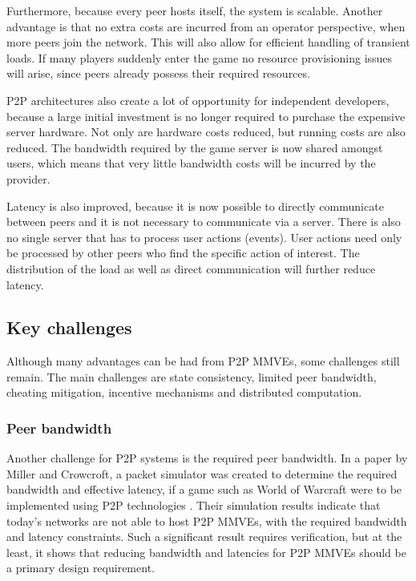 Furthermore, because every peer hosts itself, the system is scalable. Another advantage is that no extra costs are incurred from an operator
perspective, when more peers join the network. This will also allow for efficient handling of transient loads. If many players suddenly enter the
game no resource provisioning issues will arise, since peers already possess their required resources.

P2P architectures also create a lot of opportunity for independent developers, because a large initial investment is no longer required to purchase
the expensive server hardware. Not only are hardware costs reduced, but running costs are also reduced. The bandwidth required by the game server is
now shared amongst users, which means that very little bandwidth costs will be incurred by the provider.

Latency is also improved, because it is now possible to directly communicate between peers and it is not necessary to communicate via a server. There
is also no single server that has to process user actions (events). User actions need only be processed by other peers who find the specific action of interest. The distribution of the load as well as direct communication will further reduce latency.

\subsection{Key challenges}
\label{key_challenges}
Although many advantages can be had from P2P MMVEs, some challenges still remain. The main challenges are state consistency, limited peer bandwidth, cheating mitigation, incentive mechanisms and distributed computation.

\subsubsection{Peer bandwidth}
Another challenge for P2P systems is the required peer bandwidth. In a paper by Miller and Crowcroft, a packet simulator was created to determine the
required bandwidth and effective latency, if a game such as World of Warcraft were to be implemented using P2P technologies
\cite{Miller_p2p_infeasability}. Their simulation results indicate that today's networks are not able to host P2P MMVEs, with the required bandwidth
and latency constraints. Such a significant result requires verification, but at the least, it shows that reducing bandwidth and latencies for P2P
MMVEs should be a primary design requirement.


